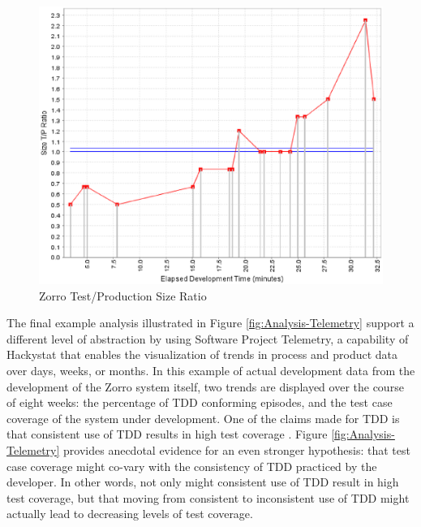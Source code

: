\documentclass[smallextended]{svjour3}     %
\begin{document}
\begin{figure}[th]
  \center
  \includegraphics[width=1.0\textwidth]{zorro-test-production-size-ratio.eps}
  \caption{Zorro Test/Production Size Ratio}
  \label{fig:Analysis-Ratio}
\end{figure} 

The final example analysis illustrated in Figure \ref{fig:Analysis-Telemetry} support a different level of abstraction by using Software Project Telemetry, a capability of Hackystat that enables the visualization of trends in process and product data over days, weeks, or months.  In this example of actual development data from the development of the Zorro system itself, two trends are displayed over the course of eight weeks: the percentage of TDD conforming episodes, and the test case coverage of the system under development.  One of the claims made for TDD is that consistent use of TDD results in high test coverage \citep{Janzen:08}.  Figure \ref{fig:Analysis-Telemetry} provides anecdotal evidence for an even stronger hypothesis: that test case coverage might co-vary with the consistency of TDD practiced by the developer. In other words, not only might consistent use of TDD result in high test coverage, but that moving from consistent to inconsistent use of TDD might actually lead to decreasing levels of test coverage. 
\end{document}
